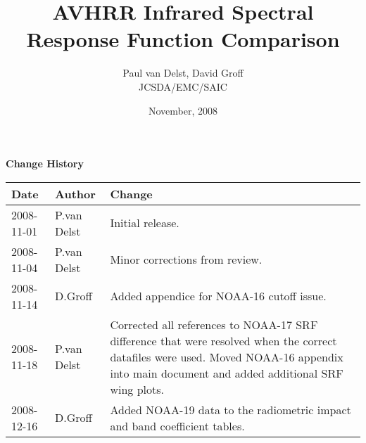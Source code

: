 



\title{AVHRR Infrared Spectral Response Function Comparison}
\author{Paul van Delst, David Groff\\JCSDA/EMC/SAIC}
\date{November, 2008}



\maketitle


\thispagestyle{empty}
\vspace*{10cm}
\begin{center}
  {\sffamily\Large\bfseries Change History}
  \begin{table}[htp]
    \centering
    \begin{tabular}{|p{2cm}|p{3cm}|p{8cm}|}
      \hline
      \sffamily\textbf{Date} & \sffamily\textbf{Author} & \sffamily\textbf{Change}\\
      \hline\hline
      2008-11-01 & P.van Delst & Initial release.\\
      \hline
      2008-11-04 & P.van Delst & Minor corrections from review.\\
      \hline
      2008-11-14 & D.Groff & Added appendice for NOAA-16 cutoff issue.\\
      \hline
      2008-11-18 & P.van Delst & Corrected all references to NOAA-17 SRF difference that were resolved when the correct datafiles were used. Moved NOAA-16 appendix into main document and added additional SRF wing plots.\\
      \hline
      2008-12-16 & D.Groff & Added NOAA-19 data to the radiometric impact and band coefficient tables.\\
      \hline
    \end{tabular}
  \end{table}
\end{center}
\clearpage
{}
\setcounter{page}{1}









\clearpage




\begin{appendix}
  
  
\end{appendix}



